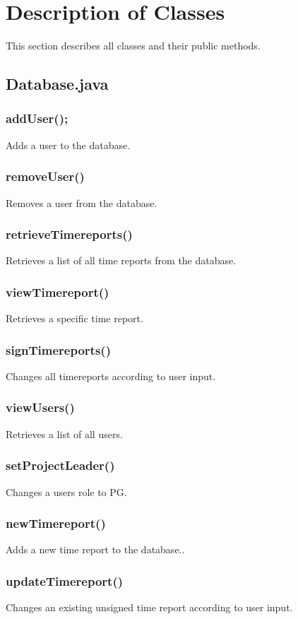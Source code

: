 \documentclass{article}
\begin{document}
\section{Description of Classes}
This section describes all classes and their public methods.

\subsection{Database.java}
\subsubsection{addUser();}

Adds a user to the database.
\subsubsection{removeUser()}
Removes a user from the database.
\subsubsection{retrieveTimereports()}
Retrieves a list of all time reports from the database.
\subsubsection{viewTimereport()}
Retrieves a specific time report.
\subsubsection{signTimereports()}
Changes all timereports according to user input.
\subsubsection{viewUsers()}
Retrieves a list of all users.
\subsubsection{setProjectLeader()}
Changes a users role to PG.
\subsubsection{newTimereport()}
Adds a new time report to the database..
\subsubsection{updateTimereport()}
Changes an existing unsigned time report according to user input.
\end{document}

